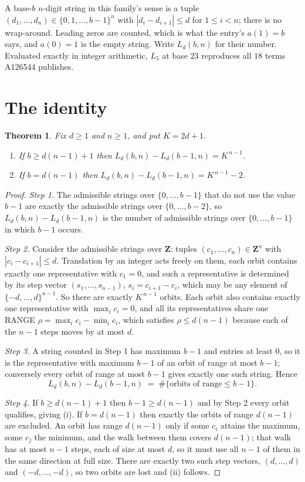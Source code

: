 \documentclass[11pt,a4paper]{article}
\theoremstyle{plain}
\newtheorem{theorem}{Theorem}
\theoremstyle{definition}
\begin{document}
A base-$b$ $n$-digit string in this family's sense is a tuple
$(d_1,\dots,d_n)\in\{0,1,\dots,b-1\}^{n}$ with $|d_i-d_{i+1}|\le d$ for $1\le i<n$; there
is no wrap-around. Leading zeros are counted, which is what the entry's $a(1)=b$ says, and
$a(0)=1$ is the empty string. Write $L_d(b,n)$ for their number. Evaluated exactly in integer
arithmetic, $L_{5}$ at base $23$ reproduces all $18$ terms A126544 publishes.

\section{The identity}

\begin{theorem}
Fix $d\ge1$ and $n\ge1$, and put $K=2d+1$.
\begin{enumerate}
\item[(i)] If $b\ge d(n-1)+1$ then $L_d(b,n)-L_d(b-1,n)=K^{\,n-1}$.
\item[(ii)] If $b=d(n-1)$ then $L_d(b,n)-L_d(b-1,n)=K^{\,n-1}-2$.
\end{enumerate}
\end{theorem}

\begin{proof}
\emph{Step 1.} The admissible strings over $\{0,\dots,b-1\}$ that do not use the value $b-1$
are exactly the admissible strings over $\{0,\dots,b-2\}$, so $L_d(b,n)-L_d(b-1,n)$ is the
number of admissible strings over $\{0,\dots,b-1\}$ in which $b-1$ occurs.

\emph{Step 2.} Consider the admissible strings over $\mathbf{Z}$: tuples
$(c_1,\dots,c_n)\in\mathbf{Z}^{n}$ with $|c_i-c_{i+1}|\le d$. Translation by an integer acts
freely on them, each orbit contains exactly one representative with $c_1=0$, and such a
representative is determined by its step vector $(s_1,\dots,s_{n-1})$, $s_i=c_{i+1}-c_i$,
which may be any element of $\{-d,\dots,d\}^{n-1}$. So there are exactly $K^{\,n-1}$ orbits.
Each orbit also contains exactly one representative with $\max_i c_i=0$, and all its
representatives share one RANGE $\rho=\max_ic_i-\min_ic_i$, which satisfies
$\rho\le d(n-1)$ because each of the $n-1$ steps moves by at most $d$.

\emph{Step 3.} A string counted in Step 1 has maximum $b-1$ and entries at least $0$, so it is
the representative with maximum $b-1$ of an orbit of range at most $b-1$; conversely every orbit
of range at most $b-1$ gives exactly one such string. Hence
\[
L_d(b,n)-L_d(b-1,n)\;=\;\#\{\text{orbits of range}\le b-1\} .
\]

\emph{Step 4.} If $b\ge d(n-1)+1$ then $b-1\ge d(n-1)$ and by Step 2 every orbit qualifies,
giving (i). If $b=d(n-1)$ then exactly the orbits of range $d(n-1)$ are excluded. An orbit has
range $d(n-1)$ only if some $c_i$ attains the maximum, some $c_j$ the minimum, and the walk
between them covers $d(n-1)$; that walk has at most $n-1$ steps, each of size at most $d$, so it
must use all $n-1$ of them in the same direction at full size. There are exactly two such step
vectors, $(d,\dots,d)$ and $(-d,\dots,-d)$, so two orbits are lost and (ii) follows.
\end{proof}
\end{document}
